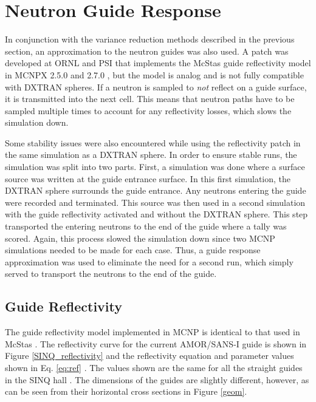 \documentclass[a4paper]{jpconf}
\begin{document}
\section{Neutron Guide Response} 

In conjunction with the variance reduction methods described in the previous section, an approximation to the neutron guides was also used.  A patch was developed at ORNL and PSI that implements the McStas guide reflectivity model in MCNPX 2.5.0 and 2.7.0 \cite{mcnp_reflectivity, EK_reflectivity}, but the model is analog and is not fully compatible with DXTRAN spheres.  If a neutron is sampled to \emph{not} reflect on a guide surface, it is transmitted into the next cell.  This means that neutron paths have to be sampled multiple times to account for any reflectivity losses, which slows the simulation down.  

Some stability issues were also encountered while using the reflectivity patch in the same simulation as a DXTRAN sphere.  In order to ensure stable runs, the simulation was split into two parts.  First, a simulation was done where a surface source was written at the guide entrance surface.  In this first simulation, the DXTRAN sphere surrounds the guide entrance.  Any neutrons entering the guide were recorded and terminated.  This source was then used in a second simulation with the guide reflectivity activated and without the DXTRAN sphere.  This step transported the entering neutrons to the end of the guide where a tally was scored.  Again, this process slowed the simulation down since two MCNP simulations needed to be made for each case.  Thus, a guide response approximation was used to eliminate the need for a second run, which simply served to transport the neutrons to the end of the guide.


\subsection{Guide Reflectivity}

The guide reflectivity model implemented in MCNP is identical to that used in McStas \cite{mcnp_reflectivity}.  The reflectivity curve for the current AMOR/SANS-I guide is shown in Figure \ref{SINQ_reflectivity} and the reflectivity equation and parameter values shown in Eq. \ref{eq:ref} \cite{mcstas}.  The values shown are the same for all the straight guides in the SINQ hall \cite{SINQ_guide_values}.  The dimensions of the guides are slightly different, however, as can be seen from their horizontal cross sections in Figure \ref{geom}.
\end{document}
